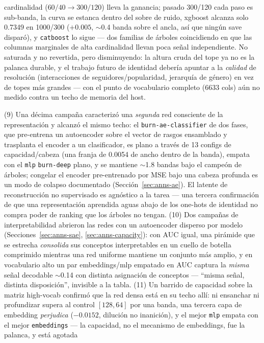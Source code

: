 \documentclass[11pt]{article}
\begin{document}
cardinalidad ($60/40\to300/120$) lleva la ganancia; pasado 300/120 cada paso es
sub-banda, la curva se estanca dentro del sobre de ruido, xgboost alcanza solo
\num{0.7349} en 1000/300 ($+0.005$, $\sim$0.4 banda sobre el ancla, así que ningún
save disparó), y \texttt{catboost} lo sigue --- dos familias de árboles coincidiendo
en que las columnas marginales de alta cardinalidad llevan poca señal independiente.
No saturada y no revertida, pero disminuyendo: la altura cruda del tope ya no es la
palanca durable, y el trabajo futuro de identidad debería apuntar a la
\emph{calidad} de resolución (interacciones de seguidores/popularidad, jerarquía de
género) en vez de topes más grandes --- con el punto de vocabulario completo (6633
cols) aún no medido contra un techo de memoria del host.

(9) Una décima campaña caracterizó una \emph{segunda} red consciente de la
representación y alcanzó el mismo techo: el \texttt{burn-ae-classifier} de dos fases,
que pre-entrena un autoencoder sobre el vector de rasgos ensamblado y trasplanta el
encoder a un clasificador, es plano a través de 13 configs de capacidad/cabeza (una
franja de \num{0.0054} de ancho dentro de la banda), empata con el \texttt{mlp}
\texttt{burn-deep} plano, y se mantiene $\sim$1.8 bandas bajo el campeón de árboles;
congelar el encoder pre-entrenado por MSE bajo una cabeza profunda es un modo de
colapso documentado (Sección~\ref{sec:anns-ae}). El latente de reconstrucción no
supervisado es agnóstico a la tarea --- una tercera confirmación de que una
representación aprendida aguas abajo de los one-hots de identidad no compra poder de
ranking que los árboles no tengan.
(10) Dos campañas de interpretabilidad abrieron las redes con un autoencoder disperso
por modelo (Secciones~\ref{sec:anns-sae}, \ref{sec:anns-capacity}): con AUC igual,
una pirámide que se estrecha \emph{consolida} sus conceptos interpretables en un
cuello de botella comprimido mientras una red uniforme mantiene un conjunto más
amplio, y en vocabulario alto un par embeddings/mlp empatado en AUC captura la
\emph{misma} señal decodable $\sim$0.14 con distinta asignación de conceptos ---
``misma señal, distinta disposición'', invisible a la tabla.
(11) Un barrido de capacidad sobre la matriz high-vocab confirmó que la red densa
está en su techo allí: ni ensanchar ni profundizar supera al control $[128,64]$ por
una banda, una tercera capa de embedding \emph{perjudica} ($-\num{0.0152}$, dilución
no inanición), y el mejor \texttt{mlp} empata con el mejor \texttt{embeddings} --- la
capacidad, no el mecanismo de embeddings, fue la palanca, y está agotada
\end{document}
